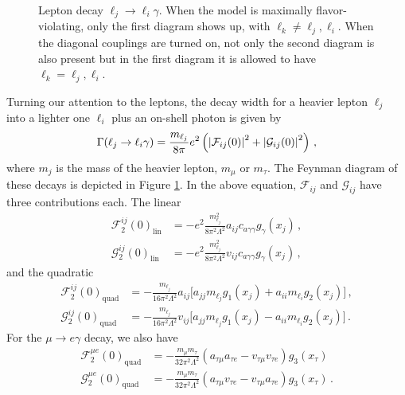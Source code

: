 \documentclass[prd,amsfonts,onecolumn,superscriptaddress,aps,nofootinbib,11pt]{revtex4-1}
\begin{document}
\begin{figure}
    \centering
    
    
    \caption{Lepton decay $\ell_j \to \ell_i \gamma$. When the model is maximally flavor-violating, only the first diagram shows up, with $\ell_k \neq \ell_j, \ell_i$. When the diagonal couplings are turned on, not only the second diagram is also present but in the first diagram it is allowed to have $\ell_k = \ell_j, \ell_i$.}
    \label{fig:lep-decay}
\end{figure}

Turning our attention to the leptons, the decay width for a heavier lepton $\ell_j$ into a lighter one $\ell_i$ plus an on-shell photon is given by \cite{Cornella:2019uxs}
\begin{equation}\label{eq:lfv-decay}
    \Gamma (\ell_j \to \ell_i \gamma) = \frac{m_{\ell_j}}{8 \pi} e^2 \left( \abs{\mathcal{F}_{ij}(0)}^2 + \abs{\mathcal{G}_{ij}(0)}^2 \right) \,,
\end{equation}
where $m_j$ is the mass of the heavier lepton, $m_\mu$ or $m_\tau$. The Feynman diagram of these decays is depicted in Figure \ref{fig:lep-decay}. In the above equation, $\mathcal{F}_{ij}$ and $\mathcal{G}_{ij}$ have three contributions each. The linear
\begin{equation}
    \begin{split}
        \mathcal{F}^{ij}_2(0)_{\mathrm{lin}} &= -e^2 \frac{m_{\ell_j}^2}{8 \pi^2 \Lambda^2} a_{ij} c_{a \gamma \gamma} g_{\gamma}(x_j) \,, \\
        \mathcal{G}^{ij}_2(0)_{\mathrm{lin}} &= -e^2 \frac{m_{\ell_j}^2}{8 \pi^2 \Lambda^2} v_{ij} c_{a \gamma \gamma} g_{\gamma}(x_j) \,,
    \end{split}
\end{equation}
and the quadratic
\begin{equation}
    \begin{split}
        \mathcal{F}^{ij}_2(0)_{\mathrm{quad}} &= -\frac{m_{\ell_j}}{16 \pi^2 \Lambda^2} a_{ij} \Big[ a_{jj} m_{\ell_j} g_1(x_j) + a_{ii} m_{\ell_i} g_2(x_j)   \Big] \,, \\
        \mathcal{G}^{ij}_2(0)_{\mathrm{quad}} &= -\frac{m_{\ell_j}}{16 \pi^2 \Lambda^2} v_{ij} \Big[ a_{jj} m_{\ell_j} g_1(x_j) - a_{ii} m_{\ell_i} g_2(x_j)   \Big] \,.
    \end{split}
\end{equation}
For the $\mu \to e \gamma$ decay, we also have
\begin{equation}\label{eq:FandGemu}
    \begin{split}
        \mathcal{F}^{\mu e}_2(0)_{\text{quad}} &= -\frac{m_\mu m_\tau}{32 \pi^2 \Lambda^2} (a_{\tau \mu} a_{\tau e}  - v_{\tau \mu} v_{\tau e} ) g_3(x_\tau) \\
        \mathcal{G}^{\mu e}_2(0)_{\text{quad}} &= -\frac{m_\mu m_\tau}{32 \pi^2 \Lambda^2} (a_{\tau \mu} v_{\tau e}  - v_{\tau \mu} a_{\tau e}) g_3(x_\tau) \,.
    \end{split}
\end{equation}
\end{document}
